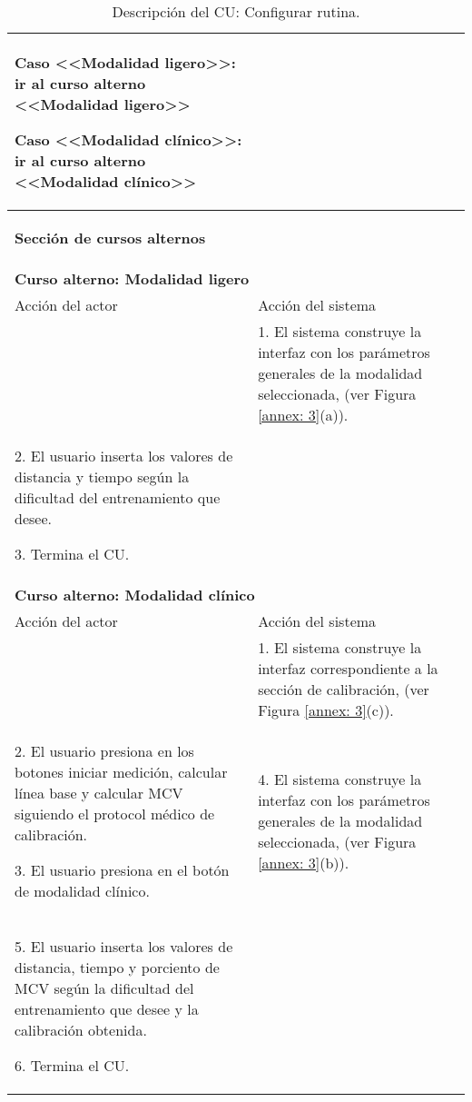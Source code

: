 \begin{table}
\begin{tabularx}{1.2\textwidth}{|X|X|}
        Caso <<Modalidad ligero>>: ir al curso alterno <<Modalidad ligero>>
        
        Caso <<Modalidad clínico>>: ir al curso alterno <<Modalidad clínico>> & \\\hline
        
        \multicolumn{2}{|X|}{        
        \begin{minipage}[t]{0.925\columnwidth}
            \begin{center}
                \textbf{Sección de cursos alternos}
            \end{center}
        \end{minipage}} \\\hline
        \multicolumn{2}{|X|}{        
        \begin{minipage}[t]{0.925\columnwidth}
                \textbf{Curso alterno: Modalidad ligero}
        \end{minipage}} \\\hline
        
        Acción del actor & Acción del sistema \\\hline
        & 
        1. El sistema construye la interfaz con los parámetros generales de la modalidad seleccionada, (ver Figura \ref{annex: 3}(a)). \\\hline
        2. El usuario inserta los valores de distancia y tiempo según la dificultad del entrenamiento que desee. 
        
        3. Termina el CU. 
        & \\\hline
        \multicolumn{2}{|X|}{        
        \begin{minipage}[t]{0.925\columnwidth}
                \textbf{Curso alterno: Modalidad clínico}
        \end{minipage}} \\\hline
        
        Acción del actor & Acción del sistema \\\hline
        & 
        1. El sistema construye la interfaz correspondiente a la sección de calibración, (ver Figura \ref{annex: 3}(c)). \\\hline
        2. El usuario presiona en los botones iniciar medición, calcular línea base y calcular MCV siguiendo el protocol médico de calibración.
        
        3. El usuario presiona en el botón de modalidad clínico.
        &
        4. El sistema construye la interfaz con los parámetros generales de la modalidad seleccionada, (ver Figura \ref{annex: 3}(b)). \\\hline
        5. El usuario inserta los valores de distancia, tiempo y porciento de MCV según la dificultad del entrenamiento que desee y la calibración obtenida. 
        
        6. Termina el CU. 
        &\\\hline
    \end{tabularx}
    \caption{Descripción del CU: Configurar rutina.}
\end{table}